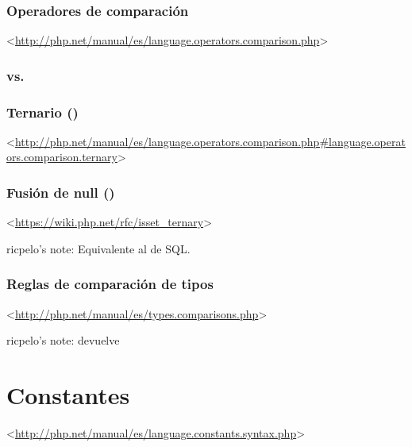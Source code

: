 \documentclass[a4paper,11pt,spanish]{sphinxmanual}
\begin{document}
\subsubsection{Operadores de comparación}
\label{\detokenize{php:operadores-de-comparacion}}
\textless{}\url{http://php.net/manual/es/language.operators.comparison.php}\textgreater{}


\subsubsection{\sphinxstyleliteralintitle{==} vs. \sphinxstyleliteralintitle{===}}
\label{\detokenize{php:vs}}

\subsubsection{Ternario ()}
\label{\detokenize{php:ternario}}
\textless{}\url{http://php.net/manual/es/language.operators.comparison.php\#language.operators.comparison.ternary}\textgreater{}


\subsubsection{Fusión de null ()}
\label{\detokenize{php:fusion-de-null}}
\textless{}\url{https://wiki.php.net/rfc/isset\_ternary}\textgreater{}

ricpelo's note: Equivalente al  de SQL.


\subsubsection{Reglas de comparación de tipos}
\label{\detokenize{php:reglas-de-comparacion-de-tipos}}
\textless{}\url{http://php.net/manual/es/types.comparisons.php}\textgreater{}

ricpelo's note:  devuelve 


\section{Constantes}
\label{\detokenize{php:constantes}}
\textless{}\url{http://php.net/manual/es/language.constants.syntax.php}\textgreater{}
\end{document}
